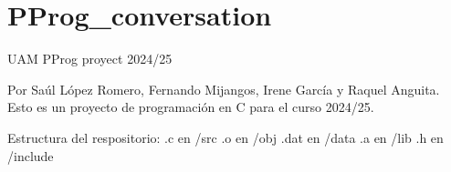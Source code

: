 \chapter{PProg\+\_\+conversation}
\hypertarget{md_README}{}\label{md_README}
\label{md_README_autotoc_md0}%
%
UAM PProg proyect 2024/25

Por Saúl López Romero, Fernando Mijangos, Irene García y Raquel Anguita. Esto es un proyecto de programación en C para el curso 2024/25.

Estructura del respositorio\+: .c en /src .o en /obj .dat en /data .a en /lib .h en /include 